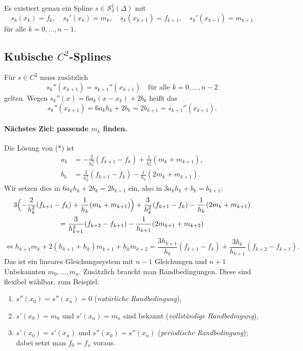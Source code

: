 \documentclass[11pt]{article}
\begin{document}
\begin{lemma}
  Es existiert genau ein Spline $s \in \mathcal{S}_3^1(\Delta)$ mit
  \[ s_k(x_k) = f_k, \quad s_k'(x_k) = m_k, \quad s_k(x_{k+1}) = f_{k+1}, \quad s_k'(x_{k+1}) = m_{k+1} \]
  für alle $k = 0, \dots, n-1$.
\end{lemma}

\subsection{Kubische \texorpdfstring{$C^2$}{C2}-Splines}


Für $s \in C^2$ muss zusätzlich
\[ s_k''(x_{k+1}) = s_{k+1}''(x_{k+1}) \quad \text{für alle } k = 0, \dots, n-2 \]
gelten.
Wegen $s_k''(x) = 6 a_k (x - x_k) + 2 b_k$ heißt das
\[ s_k''(x_{k+1}) = 6 a_k h_k + 2 b_k = 2 b_{k+1} = s_{k+1}''(x_{k+1}). \]

\paragraph{Nächstes Ziel: passende $m_k$ finden.}
Die Lösung von ($\ast$) ist
\begin{align*}
  a_k &= -\frac{2}{h_k^3} (f_{k+1} - f_k) + \frac{1}{h_k^2} (m_k + m_{k+1}), \\
  b_k &= \frac{3}{h_k^2} (f_{k+1} - f_k) - \frac{1}{h_k} (2 m_k + m_{k+1}).
\end{align*}
Wir setzen dies in $6 a_k h_k + 2 b_k = 2 b_{k+1}$ ein, also in $3 a_k h_k + b_k = b_{k+1}$:
\begin{multline*}
  3 \Bigl( -\frac{2}{h_k^2} (f_{k+1} - f_k) + \frac{1}{h_k} (m_k + m_{k+1}) \Bigr)
  + \frac{3}{h_k^2} (f_{k+1} - f_k) - \frac{1}{h_k} (2 m_k + m_{k+1}) \\
  = \frac{3}{h_{k+1}^2} (f_{k+2} - f_{k+1}) - \frac{1}{h_{k+1}} (2 m_{k+1} + m_{k+2})
\end{multline*}
\[
  \iff h_{k+1} m_k + 2 (h_{k+1} + h_k) m_{k+1} + h_k m_{k+2}
  = \frac{3 h_{k+1}}{h_k} (f_{k+1} - f_k) + \frac{3 h_k}{h_{k+1}} (f_{k+2} - f_{k+1}).
\]
Das ist ein lineares Gleichungssystem mit $n-1$ Gleichungen und $n+1$ Unbekannten $m_0, \dots, m_n$.
Zusätzlich braucht man Randbedingungen. Diese sind flexibel wählbar, zum Beispiel:
\begin{enumerate}
  \item $s''(x_0) = s''(x_n) = 0$ (\emph{natürliche Randbedingung}),
  \item $s'(x_0) = m_0$ und $s'(x_n) = m_n$ sind bekannt (\emph{vollständige Randbedingung}),
  \item $s'(x_0) = s'(x_n)$ und $s''(x_0) = s''(x_n)$ (\emph{periodische Randbedingung}); dabei setzt man $f_0 = f_n$ voraus.
\end{enumerate}
\end{document}
